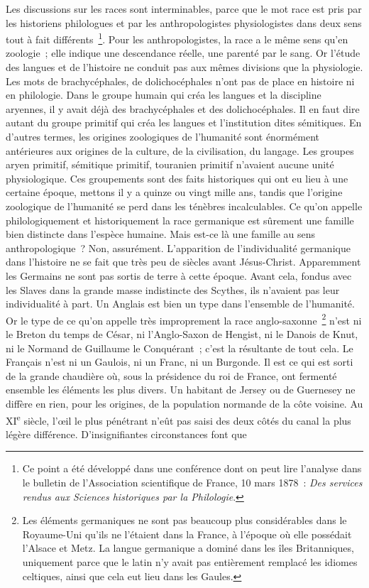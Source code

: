 \documentclass[french,twoside]{book} %
\newcommand\orgName[1]{#1}
\newcommand\persName[1]{#1}
\newcommand\placeName[1]{#1}
\begin{document}
Les discussions sur les races sont interminables, parce que le mot race est pris par les historiens philologues et par les anthropologistes physiologistes dans deux sens tout à fait différents \footnote{Ce point a été développé dans une conférence dont on peut lire l’analyse dans le bulletin de l’Association scientifique de {\placeName France}, 10 mars 1878 : \emph{Des services rendus aux Sciences historiques par la Philologie}.}. Pour les anthropologistes, la race a le même sens qu’en zoologie ; elle indique une descendance réelle, une parenté par le sang. Or l’étude des langues et de l’histoire ne conduit pas aux mêmes divisions que la physiologie. Les mots de brachycéphales, de dolichocéphales n’ont pas de place en histoire ni en philologie. Dans le groupe humain qui créa les langues et la discipline aryennes, il y avait déjà des brachycéphales et des dolichocéphales. Il en faut dire autant du groupe primitif qui créa les langues et l’institution dites sémitiques. En d’autres termes, les origines zoologiques de l’humanité sont énormément antérieures aux origines de la culture, de la civilisation, du langage. Les groupes aryen primitif, sémitique primitif, touranien primitif n’avaient aucune unité physiologique. Ces groupements sont des faits historiques qui ont eu lieu à une certaine époque, mettons il y a quinze ou vingt mille ans, tandis que l’origine zoologique de l’humanité se perd dans les ténèbres incalculables. Ce qu’on appelle philologiquement et historiquement la race germanique est sûrement une famille bien distincte dans l’espèce humaine. Mais est-ce là une famille au sens anthropologique ? Non, assurément. L’apparition de l’individualité germanique dans l’histoire ne se fait que très peu de siècles avant {\persName Jésus-Christ}. Apparemment les {\orgName Germains} ne sont pas sortis de terre à cette époque. Avant cela, fondus avec les {\orgName Slaves} dans la grande masse indistincte des {\orgName Scythes}, ils n’avaient pas leur individualité à part. Un Anglais est bien un type dans l’ensemble de l’humanité. Or le type de ce qu’on appelle très improprement la race anglo-saxonne \footnote{Les éléments germaniques ne sont pas beaucoup plus considérables dans le {\placeName Royaume-Uni} qu’ils ne l’étaient dans la {\placeName France}, à l’époque où elle possédait l’{\placeName Alsace} et {\placeName Metz}. La langue germanique a dominé dans les {\placeName îles Britanniques}, uniquement parce que le latin n’y avait pas entièrement remplacé les idiomes celtiques, ainsi que cela eut lieu dans les {\placeName Gaules}.} n’est ni le Breton du temps de {\persName César}, ni l’Anglo-Saxon de {\persName Hengist}, ni le Danois de {\persName Knut}, ni le Normand de {\persName Guillaume le Conquérant} ; c’est la résultante de tout cela. Le Français n’est ni un Gaulois, ni un Franc, ni un Burgonde. Il est ce qui est sorti de la grande chaudière où, sous la présidence du {\persName roi de France}, ont fermenté ensemble les éléments les plus divers. Un habitant de {\placeName Jersey} ou de {\placeName Guernesey} ne diffère en rien, pour les origines, de la {\orgName population normande} de la côte voisine. Au XI\textsuperscript{e} siècle, l’œil le plus pénétrant n’eût pas saisi des deux côtés du canal la plus légère différence. D’insignifiantes circonstances font que 
\end{document}
